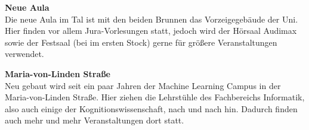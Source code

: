 \textbf{Neue Aula}\\
Die neue Aula im Tal ist mit den beiden Brunnen das Vorzeigegebäude der Uni. Hier finden vor allem Jura-Vorlesungen statt, jedoch wird der Hörsaal Audimax sowie der Festsaal (bei im ersten Stock) gerne für größere Veranstaltungen verwendet.

\textbf{Maria-von-Linden Straße}\\
Neu gebaut wird seit ein paar Jahren der Machine Learning Campus in der Maria-von-Linden Straße. Hier ziehen die Lehrstühle des Fachbereichs Informatik, also auch einige der Kognitionswissenschaft, nach und nach hin. Dadurch finden auch mehr und mehr Veranstaltungen dort statt.

\vfill
